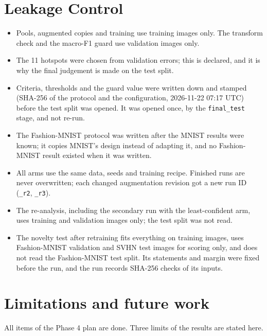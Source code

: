 \documentclass[11pt]{article}
\begin{document}
\section{Leakage Control}

\begin{itemize}[leftmargin=1.4em, itemsep=1pt]
  \item Pools, augmented copies and training use training images only. The transform check and the macro-F1 guard use validation images only.
  \item The 11 hotspots were chosen from validation errors; this is declared, and it is why the final judgement is made on the test split.
  \item Criteria, thresholds and the guard value were written down and stamped (SHA-256 of the protocol and the configuration, 2026-11-22 07:17 UTC) before the test split was opened. It was opened once, by the \texttt{final\_test} stage, and not re-run.
  \item The Fashion-MNIST protocol was written after the MNIST results were known; it copies MNIST's design instead of adapting it, and no Fashion-MNIST result existed when it was written.
  \item All arms use the same data, seeds and training recipe. Finished runs are never overwritten; each changed augmentation revision got a new run ID (\texttt{\_r2}, \texttt{\_r3}).
  \item The re-analysis, including the secondary run with the least-confident arm, uses training and validation images only; the test split was not read.
  \item The novelty test after retraining fits everything on training images, uses Fashion-MNIST validation and SVHN test images for scoring only, and does not read the Fashion-MNIST test split. Its statements and margin were fixed before the run, and the run records SHA-256 checks of its inputs.
\end{itemize}

\section{Limitations and future work}\label{sec:open}

All items of the Phase 4 plan are done. Three limits of the results are stated here.
\end{document}
